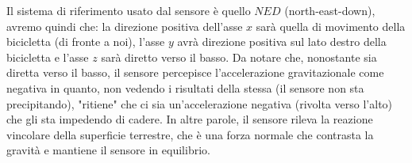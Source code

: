 \documentclass[class=article]{standalone}
\begin{document}
	Il sistema di riferimento usato dal sensore è quello \(NED\) (north-east-down), avremo quindi che: la direzione positiva dell'asse \(x\) sarà quella di movimento della bicicletta (di fronte a noi), l'asse \(y\) avrà direzione positiva sul lato destro della bicicletta e l'asse \(z\) sarà diretto verso il basso.
	Da notare che, nonostante sia diretta verso il basso, il sensore percepisce l'accelerazione gravitazionale come negativa in quanto, non vedendo i risultati della stessa (il sensore non sta precipitando), "ritiene" che ci sia un'accelerazione negativa (rivolta verso l'alto) che gli sta impedendo di cadere. 
	In altre parole, il sensore rileva la reazione vincolare della superficie terrestre, che è una forza normale che contrasta la gravità e mantiene il sensore in equilibrio.
	
	
	
\end{document}
